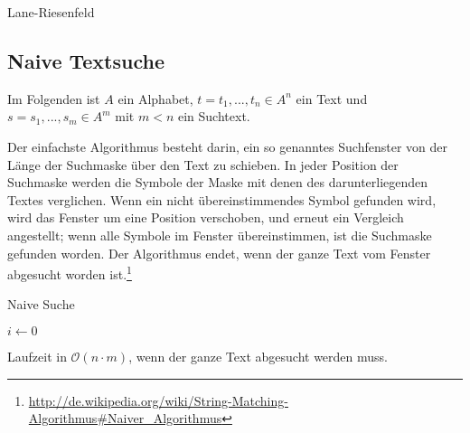 \begin{algorithm}[H]
	\caption{Lane-Riesenfeld}

	\BlankLine

\end{algorithm}



\subsection{Naive Textsuche}
Im Folgenden ist \(A\) ein Alphabet, \(t = t_1,...,t_n \in A^n\) ein Text und \(s = s_1,...,s_m \in A^m\) mit \(m<n\) ein Suchtext.

Der einfachste Algorithmus besteht darin, ein so genanntes Suchfenster von der Länge der Suchmaske über den Text zu schieben. In jeder Position der Suchmaske werden die Symbole der Maske mit denen des darunterliegenden Textes verglichen. Wenn ein nicht übereinstimmendes Symbol gefunden wird, wird das Fenster um eine Position verschoben, und erneut ein Vergleich angestellt; wenn alle Symbole im Fenster übereinstimmen, ist die Suchmaske gefunden worden. Der Algorithmus endet, wenn der ganze Text vom Fenster abgesucht worden ist.\footnote{\url{http://de.wikipedia.org/wiki/String-Matching-Algorithmus\#Naiver_Algorithmus}}

\begin{algorithm}[H]
	\caption{Naive Suche}

	\BlankLine

	$i \longleftarrow 0$\newline
\end{algorithm}
Laufzeit in \(\mathcal{O}(n\cdot m)\), wenn der ganze Text abgesucht werden muss.

